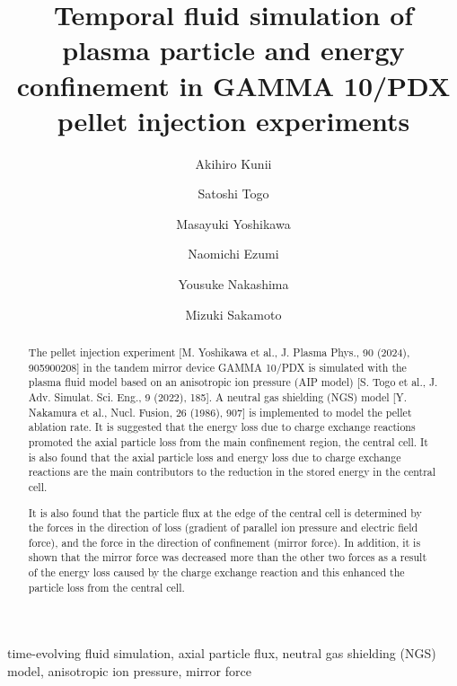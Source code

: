 \documentclass{jasse}%
\title{Temporal fluid simulation of plasma particle and energy confinement in GAMMA 10/PDX pellet injection experiments}
\author[1,*]{Akihiro Kunii}%
\author[1]{Satoshi Togo}
\author[1]{Masayuki Yoshikawa}
\author[1]{Naomichi Ezumi}
\author[1]{Yousuke Nakashima}
\author[1]{Mizuki Sakamoto}
\affil[1]{{Plasma Research Center, University of Tsukuba, Tsukuba 305-8577, Japan}}
\begin{document}
\maketitle
\thispagestyle{titlepage}

\begin{abstract}
    The pellet injection experiment [M. Yoshikawa et al., J. Plasma Phys., 90 (2024), 905900208] in the tandem mirror device GAMMA 10/PDX is simulated with the plasma fluid model based on an anisotropic ion pressure (AIP model) [S. Togo et al., J. Adv. Simulat. Sci. Eng., 9 (2022), 185]. A neutral gas shielding (NGS) model [Y. Nakamura et al., Nucl. Fusion, 26 (1986), 907] is implemented to model the pellet ablation rate. It is suggested that the energy loss due to charge exchange reactions promoted the axial particle loss from the main confinement region, the central cell. It is also found that the axial particle loss and energy loss due to charge exchange reactions are the main contributors to the reduction in the stored energy in the central cell.

    
    It is also found that the particle flux at the edge of the central cell is determined by the forces in the direction of loss (gradient of parallel ion pressure and electric field force), and the force in the direction of confinement (mirror force). In addition, it is shown that the mirror force was decreased more than the other two forces as a result of the energy loss caused by the charge exchange reaction and this enhanced the particle loss from the central cell.
\end{abstract}

\begin{keywords}
    time-evolving fluid simulation, axial particle flux, neutral gas shielding (NGS) model, anisotropic ion pressure, mirror force
\end{keywords}

\end{document}
